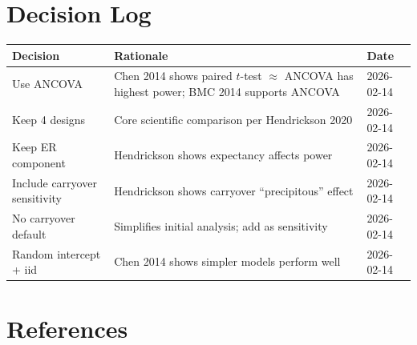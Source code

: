 \documentclass[11pt]{article}
\begin{document}
\section{Decision Log}

\begin{table}[h]
\centering\small
\begin{tabular}{@{}L{3.5cm}L{8cm}l@{}}
\toprule
Decision & Rationale & Date \\
\midrule
Use ANCOVA & Chen 2014 shows paired $t$-test $\approx$ ANCOVA has highest power; BMC 2014 supports ANCOVA & 2026-02-14 \\
Keep 4 designs & Core scientific comparison per Hendrickson 2020 & 2026-02-14 \\
Keep ER component & Hendrickson shows expectancy affects power & 2026-02-14 \\
Include carryover sensitivity & Hendrickson shows carryover ``precipitous'' effect & 2026-02-14 \\
No carryover default & Simplifies initial analysis; add as sensitivity & 2026-02-14 \\
Random intercept + iid & Chen 2014 shows simpler models perform well & 2026-02-14 \\
\bottomrule
\end{tabular}
\end{table}


\section{References}
\end{document}
